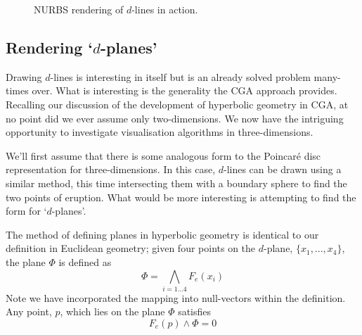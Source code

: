 \begin{figure} \centering
{}
\caption{NURBS rendering of $d$-lines in action.}
\label{fig:hyp1}
\end{figure}

\subsection{Rendering `$d$-planes'}


Drawing $d$-lines is interesting in itself but is an already solved 
problem many-times over. What is interesting is the generality the CGA
approach provides. Recalling our discussion of the development of
hyperbolic geometry in CGA, at no point did we ever assume only 
two-dimensions. We now have the intriguing opportunity to investigate
visualisation algorithms in three-dimensions.

We'll first assume that there is some analogous form to the Poincar\'e
disc representation for three-dimensions. In this case, $d$-lines can
be drawn using a similar method, this time intersecting them with a 
boundary sphere to find the two points of eruption. What would be 
more interesting is attempting to find the form for `$d$-planes'.

The method of defining planes in hyperbolic geometry is identical
to our definition in Euclidean geometry; given four points on the
$d$-plane, $\{ x_1, ..., x_4 \}$, the plane $\Phi$ is defined as
\begin{equation}
\Phi = \bigwedge_{i = 1...4} F_e(x_i)
\label{eqn:plane}
\end{equation}
Note we have incorporated the mapping into null-vectors within
the definition. Any point, $p$, which lies on the plane $\Phi$ satisfies
\[
F_e(p) \wedge \Phi = 0
\]

